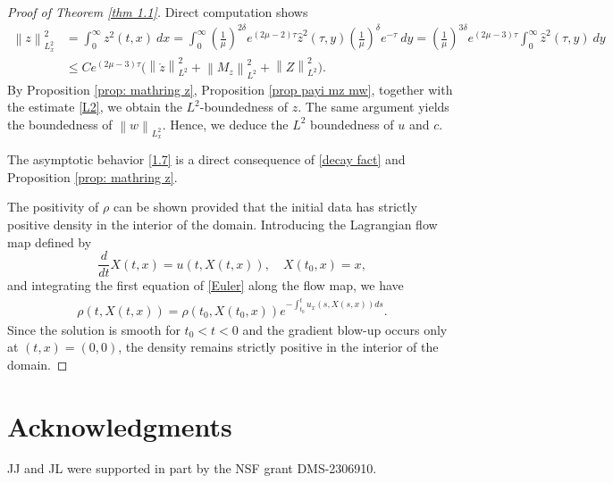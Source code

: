 \documentclass{article}
\newcommand{\norm}[1]{\left\lVert#1\right\rVert}
\def\espz{Z}
\def\mz{M_z}
\numberwithin{equation}{section}
\begin{document}
\begin{proof}[Proof of Theorem \ref{thm 1.1}]
    Direct computation shows
    \begin{align*}
        \norm{z}_{L^2_x}^2 &= \int_0^\infty z^2(t,x) \ dx = \int_0^\infty (\frac{1}{\mu})^{2\delta} e^{(2\mu-2)\tau}\hat z^2(\tau,y)(\frac{1}{\mu})^{\delta} e^{- \tau} \ dy = (\frac{1}{\mu})^{3\delta} e^{(2\mu- 3)\tau}\int_0^\infty \hat z^2(\tau,y) \ dy\\
       & \leq Ce^{(2\mu- 3)\tau} \big(\norm{\mathring z}_{L^2}^2+\norm{\mz}_{L^2}^2+\norm{\espz}_{L^2}^2 \big).
    \end{align*}
 By Proposition \ref{prop: mathring z}, Proposition \ref{prop payi mz mw}, together with the estimate \eqref{L2}, we obtain the $L^2$-boundedness of $z$. The same argument yields the boundedness of $\norm{w}_{L^2_x}$. 
 Hence, we deduce the $L^2$ boundedness of $u$ and $c$. 
 
 The asymptotic behavior \eqref{1.7} is a direct consequence of \eqref{decay fact} and Proposition \ref{prop: mathring z}.
 
    The positivity of $\rho$ can be shown provided that the initial data has strictly positive density in the interior of the domain. Introducing the Lagrangian flow map defined by
    \[\frac{d}{dt}X(t,x) = u(t,X(t,x)),\quad X(t_0,x)=x,\]and integrating the first equation of \eqref{Euler} along the flow map, we have 
    \begin{align*}
        \rho(t,X(t,x)) = \rho(t_0,X(t_0,x)) e^{-\int_{t_0}^t u_x(s,X(s,x))ds}.
    \end{align*}
    Since the solution is smooth for $t_0<t<0$ 
    and the gradient blow-up occurs only at $(t,x)=(0,0)$, the density remains strictly positive in the interior of the domain. 
\end{proof}













\section*{Acknowledgments}
JJ and JL were supported in part by the NSF grant DMS-2306910. 


\appendix
\end{document}
